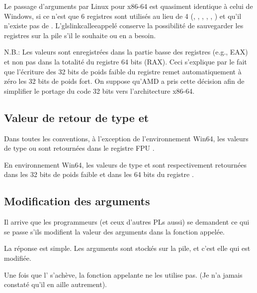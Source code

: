 Le passage d'arguments par Linux pour x86-64 est quasiment identique à celui de Windows, si ce n'est
que 6 registres sont utilisés au lieu de 4 (\RDI, \RSI, \RDX, \RCX, , ) et qu'il n'existe
pas de . L'glslink{callee}{appelé} conserve la possibilité de sauvegarder les registres sur la
pile s'il le souhaite ou en a besoin.




N.B.: Les valeurs sont enregistrées dans la partie basse des registres (e.g., EAX) et non pas dans la
totalité du registre 64 bits (RAX).
Ceci s'explique par le fait que l'écriture des 32 bits de poids faible du registre remet automatiquement
à zéro les 32 bits de poids fort.
On suppose qu'AMD a pris cette décision afin de simplifier le portage du code 32 bits vers l'architecture
x86-64.

\subsection{Valeur de retour de type \Tfloat et \Tdouble}

Dans toutes les conventions, à l'exception de l'environnement Win64, les valeurs de type \Tfloat ou
\Tdouble sont retournées dans le registre FPU .

En environnement Win64, les valeurs de type \Tfloat et \Tdouble sont respectivement retournées dans
les 32 bits de poids faible et dans les 64 bits du registre .

\subsection{Modification des arguments}

Il arrive que les programmeurs \CCpp{} (et ceux d'autres \ac{PL}s aussi) se demandent ce qui se passe
s'ils modifient la valeur des arguments dans la fonction appelée.

La réponse est simple. Les arguments sont stockés sur la pile, et c'est elle qui est modifiée.

Une fois que l' s'achève, la fonction appelante ne les utilise pas.
(Je n'a jamais constaté qu'il en aille autrement).



